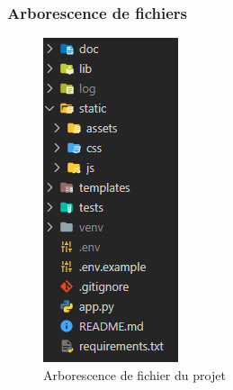 \documentclass[a4paper,14pt]{extarticle}
\begin{document}
{\subsubsection{Arborescence de fichiers}

\begin{figure}[htp]
    \centering
    \includegraphics{../img/arborescenceFichier.png}
    \caption{Arborescence de fichier du projet}
    \label{fig:arborescenceFichier}
\end{figure}

}
\end{document}

